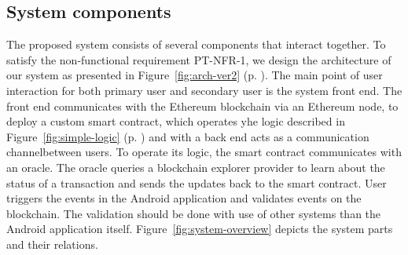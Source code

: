 \subsection{System components}
The proposed system consists of several components that interact together. To satisfy the non-functional requirement PT-NFR-1, we design the architecture of our system as presented in Figure~\ref{fig:arch-ver2} (p. \pageref{fig:arch-ver2}). The main point of user interaction for both primary user and secondary user is the system front end. The front end communicates with the Ethereum blockchain via an Ethereum node, to deploy a custom smart contract, which operates yhe logic described in Figure~\ref{fig:simple-logic} (p. \pageref{fig:simple-logic}) and with a back end acts as a communication channel\footnotemark between users. To operate its logic, the smart contract communicates with an oracle. The oracle queries a blockchain explorer provider to learn about the status of a transaction and sends the updates back to the smart contract. User triggers the events in the Android application and validates events on the blockchain. The validation should be done with use of other systems than the Android application itself. Figure~\ref{fig:system-overview} depicts the system parts and their relations.


